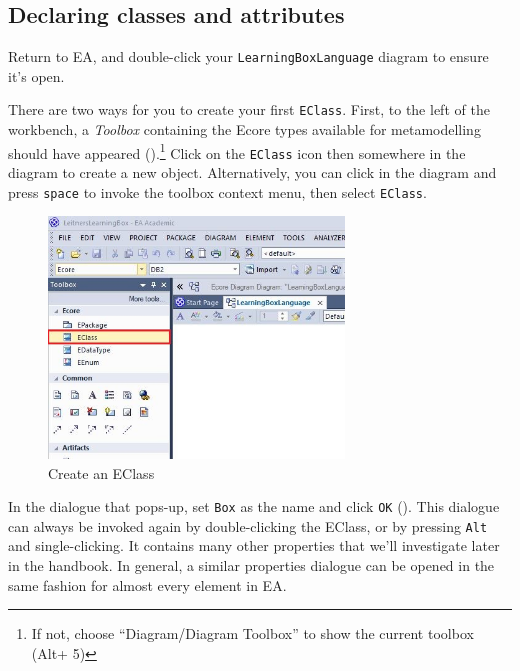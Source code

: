 \newpage
\subsection{Declaring classes and attributes}
\genHeader
\hypertarget{static:classes vis}{}

\begin{stepbystep}

\item Return to EA, and double-click your \texttt{LearningBoxLanguage} diagram to ensure it's open.

\vspace{0.5cm}

\item There are two ways for you to create your first \texttt{EClass}. First, to the left of the workbench, a \emph{Toolbox} containing
the Ecore types available for metamodelling should have appeared ().\footnote{If not, choose ``Diagram/Diagram Toolbox'' to show the
current toolbox (Alt+ 5)} Click on the \texttt{EClass} icon then somewhere in the diagram to create a new object. Alternatively, you can click in the diagram and press
\texttt{space} to invoke the toolbox context menu, then select \texttt{EClass}.

\vspace{0.5cm}

\begin{figure}[htbp]
	\centering
  \includegraphics[width=0.7\textwidth]{../../org.moflon.doc.handbook.02_leitnersLearningBox/2_staticSemantics/2_definingClasses/dcVisImages/ea_createEClass}
	\caption{Create an EClass}
	\label{ea:eclass}
\end{figure}

\vspace{0.5cm}

\item In the dialogue that pops-up, set \texttt{Box} as the name and click \texttt{OK} ().
This dialogue can always be invoked again by double-clicking the EClass, or by pressing \texttt{Alt} and single-clicking. It contains many other properties that we'll investigate later in the handbook. In general, a similar properties dialogue can be opened in the same fashion for almost every element in EA.


\end{stepbystep}
